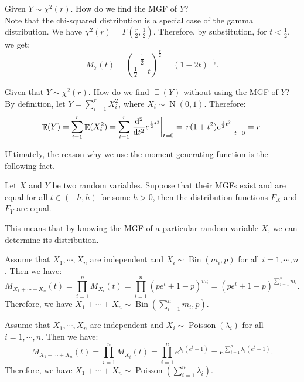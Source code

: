 \documentclass{huhtakm-template-book-v2}
\DeclareMathOperator{\E}{\mathbb{E}}
\DeclareMathOperator{\Bin}{Bin}
\DeclareMathOperator{\Poisson}{Poisson}
\DeclareMathOperator{\N}{N}
\begin{document}
    \begin{eg}
        Given $Y \sim \chi^{2}(r)$. How do we find the MGF of $Y$?\\
        Note that the chi-squared distribution is a special case of the gamma distribution. We have $\chi^{2}(r) = \Gamma\left(\frac{r}{2}, \frac{1}{2}\right)$. Therefore, by substitution, for $t < \frac{1}{2}$, we get:
        \begin{equation*}
            M_{Y}(t) = \left(\frac{\frac{1}{2}}{\frac{1}{2} - t}\right)^{\frac{r}{2}} = (1 - 2t)^{-\frac{r}{2}}.
        \end{equation*}
    \end{eg}
    \begin{eg}
        Given that $Y \sim \chi^{2}(r)$. How do we find $\E(Y)$ without using the MGF of $Y$?\\
        By definition, let $Y = \sum_{i=1}^{r} X_{i}^{2}$, where $X_{i} \sim \N(0, 1)$. Therefore:
        \begin{equation*}
            \E(Y) = \sum_{i=1}^{r} \E(X_{i}^{2}) = \sum_{i=1}^{r} \left.\odv*[order={2}]{}{t} e^{\frac{1}{2}t^{2}}\right|_{t=0} = \left.r(1 + t^{2})e^{\frac{1}{2}t^{2}}\right|_{t=0} = r.
        \end{equation*}
    \end{eg}
    Ultimately, the reason why we use the moment generating function is the following fact.
    \begin{thm}
        Let $X$ and $Y$ be two random variables. Suppose that their MGFs exist and are equal for all $t \in (-h, h)$ for some $h > 0$, then the distribution functions $F_{X}$ and $F_{Y}$ are equal.
    \end{thm}
    This means that by knowing the MGF of a particular random variable $X$, we can determine its distribution.
    \begin{eg}
        Assume that $X_{1}, \cdots, X_{n}$ are independent and $X_{i} \sim \Bin(m_{i}, p)$ for all $i = 1, \cdots, n$. Then we have:
        \begin{equation*}
            M_{X_{1} + \cdots + X_{n}}(t) = \prod_{i=1}^{n} M_{X_{i}}(t) = \prod_{i=1}^{n} (pe^{t} + 1 - p)^{m_{i}} = (pe^{t} + 1 - p)^{\sum_{i=1}^{n} m_{i}}.
        \end{equation*}
        Therefore, we have $X_{1} + \cdots + X_{n} \sim \Bin\left(\sum_{i=1}^{n} m_{i}, p\right)$.
    \end{eg}
    \begin{eg}
        Assume that $X_{1}, \cdots, X_{n}$ are independent and $X_{i} \sim \Poisson(\lambda_{i})$ for all $i = 1, \cdots, n$. Then we have:
        \begin{equation*}
            M_{X_{1} + \cdots + X_{n}}(t) = \prod_{i=1}^{n} M_{X_{i}}(t) = \prod_{i=1}^{n} e^{\lambda_{i}(e^{t} - 1)} = e^{\sum_{i=1}^{n} \lambda_{i}(e^{t} - 1)}.
        \end{equation*}
        Therefore, we have $X_{1} + \cdots + X_{n} \sim \Poisson\left(\sum_{i=1}^{n} \lambda_{i}\right)$.
    \end{eg}
\end{document}
